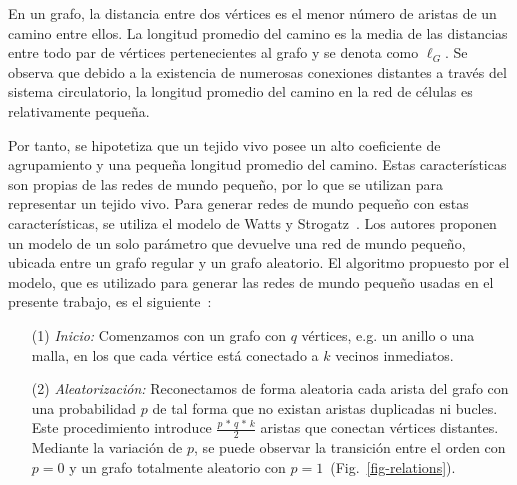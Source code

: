 En un grafo, la distancia entre dos v\'ertices es el menor n\'umero de aristas de un camino entre ellos. La longitud promedio del camino es la media de las distancias entre todo par de v\'ertices pertenecientes al grafo y se denota como $\ell_G$. Se observa que debido a la existencia de numerosas conexiones distantes a través del sistema circulatorio, la longitud promedio del camino en la red de células es relativamente pequeña.

Por tanto, se hipotetiza que un tejido vivo posee un alto coeficiente de agrupamiento y una pequeña longitud promedio del camino. Estas características son propias de las redes de mundo pequeño, por lo que se utilizan para representar un tejido vivo. Para generar redes de mundo pequeño con estas características, se utiliza el modelo de Watts y Strogatz~\cite{9}. Los autores proponen un modelo de un solo par\'ametro que devuelve una red de mundo peque\~no, ubicada entre un grafo regular y un grafo aleatorio. El algoritmo propuesto por el modelo, que es utilizado para generar las redes de mundo peque\~no usadas en el presente trabajo, es el siguiente~\cite{complexnetworks}:

\begin{enumerate}
\item [(1)] \emph{Inicio:} Comenzamos con un grafo con $q$ v\'ertices, e.g. un anillo o una malla, en los que cada v\'ertice est\'a conectado a $k$ vecinos inmediatos. 

\item [(2)] \emph{Aleatorizaci\'on:} Reconectamos de forma aleatoria cada arista del grafo con una probabilidad $p$ de tal forma que no existan aristas duplicadas ni bucles. Este procedimiento introduce $\frac{p\,*\,q\,*\,k}{2} $ aristas que conectan v\'ertices distantes. Mediante la variaci\'on de $p$, se puede observar la transici\'on entre el orden con $p = 0$ y un grafo totalmente aleatorio con $p = 1$~(Fig.~\ref{fig-relations}).
\end{enumerate}

